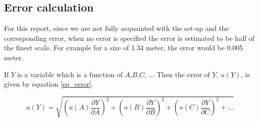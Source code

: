 \subsection{Error calculation}

For this report, since we are not fully acquainted with the set-up and the corresponding error, when no error is specified the error is estimated to be half of the finest scale. For example for a size of 1.34 meter, the error would be 0.005 meter.

If $Y$ is a variable which is a function of $A$,$B$,$C$, ... Then the error of $Y$, $u(Y)$, is given by equation \ref{eq_error}.

\begin{equation}
	\label{eq_error}
	u(Y) = \sqrt{\left(u(A) \frac{\partial Y}{\partial A}\right)^2 + \left(u(B) \frac{\partial Y}{\partial B}\right)^2 + \left(u(C) \frac{\partial Y}{\partial C}\right)^2 + ...}
\end{equation}



